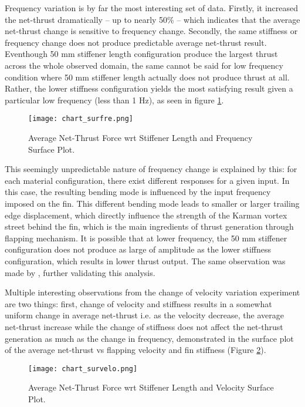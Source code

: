 Frequency variation is by far the most interesting set of data. Firstly, it increased the net-thrust dramatically -- up to nearly 50\% -- which indicates that the average net-thrust change is sensitive to frequency change. Secondly, the same stiffness or frequency change does not produce predictable average net-thrust result. Eventhough 50 mm stiffener length configuration produce the largest thrust across the whole observed domain, the same cannot be said for low frequency condition where 50 mm stiffener length actually does not produce thrust at all. Rather, the lower stiffness configuration yields the most satisfying result given a particular low frequency (less than 1 Hz), as seen in figure \ref{fig:chart_surfre}.
\begin{figure}[H]
    \centering
    \texttt{[image: chart\_surfre.png]}
    \caption{Average Net-Thrust Force wrt Stiffener Length and Frequency Surface Plot.}
    \label{fig:chart_surfre}
\end{figure}
This seemingly unpredictable nature of frequency change is explained by this: for each material configuration, there exist different responses for a given input. In this case, the resulting bending mode is influenced by the input frequency imposed on the fin. This different bending mode leads to smaller or larger trailing edge displacement, which directly influence the strength of the Karman vortex street behind the fin, which is the main ingredients of thrust generation through flapping mechanism. It is possible that at lower frequency, the 50 mm stiffener configuration does not produce as large of amplitude as the lower stiffness configuration, which results in lower thrust output. The same observation was made by \citet{Esposito56}, further validating this analysis.\par
Multiple interesting observations from the change of velocity variation experiment are two things: first, change of velocity and stiffness results in a somewhat uniform change in average net-thrust i.e. as the velocity decrease, the average net-thrust increase while the change of stiffness does not affect the net-thrust generation as much as the change in frequency, demonstrated in the surface plot of the average net-thrust vs flapping velocity and fin stiffness (Figure \ref{fig:chart_survelo}).
\begin{figure}[H]
    \centering
    \texttt{[image: chart\_survelo.png]}
    \caption{Average Net-Thrust Force wrt Stiffener Length and Velocity Surface Plot.}
    \label{fig:chart_survelo}
\end{figure}
